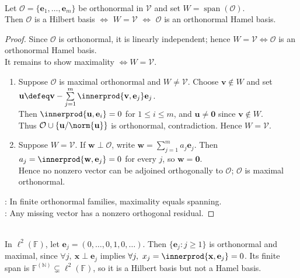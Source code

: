 \begin{proposition} \label{prop:finite-hilbert-basis-hamel-basis} \\
Let $\mathcal{O}=\{\mathbf{e}_1,\ldots,\mathbf{e}_m\}$ be orthonormal in $\mathcal{V}$ and set $W=\operatorname{span}(\mathcal{O})$.\\
Then $\mathcal{O}$ is a Hilbert basis $\Longleftrightarrow$ $W=\mathcal{V}$ $\Longleftrightarrow$ $\mathcal{O}$ is an orthonormal Hamel basis.
\begin{proof}
Since $\mathcal O$ is orthonormal, it is linearly independent; hence $W=\mathcal V\Longleftrightarrow\mathcal O$ is an orthonormal Hamel basis.\\
It remains to show maximality $\Longleftrightarrow W=\mathcal V$.
\begin{enumerate}[label=\roman*.]
\setlength{\itemsep}{0pt}
\item[$(\Rightarrow)$] Suppose $\mathcal O$ is maximal orthonormal and $W\ne\mathcal V$. Choose $\mathbf v\notin W$ and set $\mathbf u\defeq\mathbf v-\sum\limits_{j=1}^{m}\innerprod{\mathbf v,\mathbf e_j}\mathbf e_j$.\\
Then $\innerprod{\mathbf u,\mathbf e_i}=0$ for $1\leq i\leq m$, and $\mathbf u\ne\mathbf0$ since $\mathbf v\notin W$.\\
Thus $\mathcal O\cup\{\mathbf u/\norm{\mathbf u}\}$ is orthonormal, contradiction. Hence $W=\mathcal V$.
\item[$(\Leftarrow)$] Suppose $W=\mathcal V$. If $\mathbf w\perp\mathcal O$, write $\mathbf w=\sum\limits_{j=1}^{m}a_j\mathbf e_j$. Then $a_j=\innerprod{\mathbf w,\mathbf e_j}=0$ for every $j$, so $\mathbf w=\mathbf0$.\\
Hence no nonzero vector can be adjoined orthogonally to $\mathcal O$; $\mathcal O$ is maximal orthonormal.
\end{enumerate}
: In finite orthonormal families, maximality equals spanning.\\
: Any missing vector has a nonzero orthogonal residual.
\end{proof}
\end{proposition}

\begin{example} \label{ex:hilbert-basis-not-hamel-basis-l2} \\
In $\ell^2(\mathbb{F})$, let $\mathbf{e}_j=(0,\ldots,0,1,0,\ldots)$. Then $\{\mathbf{e}_j:j\geq1\}$ is orthonormal and maximal, since $\forall j,\ \mathbf{x}\perp\mathbf{e}_j$ implies $\forall j,\ x_j=\innerprod{\mathbf{x},\mathbf{e}_j}=0$. Its finite span is $\mathbb{F}^{(\mathbb{N})}\subsetneq\ell^2(\mathbb{F})$, so it is a Hilbert basis but not a Hamel basis.
\end{example}

